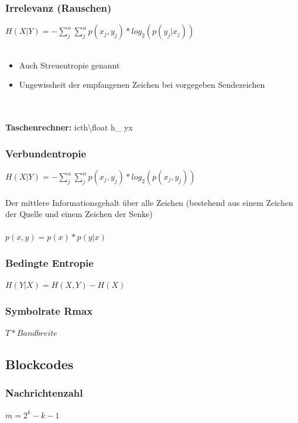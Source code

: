 \subsubsection{Irrelevanz (Rauschen)}
$H(X|Y)=-\sum_j^n\sum_j^np(x_j,y_j)*log_2(p(y_j|x_j))$
\\
\\
\begin{itemize}
	\item Auch Streuentropie genannt
	\item Ungewissheit der empfangenen Zeichen bei vorgegeben Sendezeichen
\end{itemize}
\\
\\
\textbf{Taschenrechner:} icth\textbackslash float h\_ yx

\subsubsection{Verbundentropie}
$H(X|Y)=-\sum_j^n\sum_j^np(x_j,y_j)*log_2(p(x_j,y_j))$
\\
\\
Der mittlere Informationsgehalt über alle Zeichen (bestehend aus einem Zeichen der Quelle und einem Zeichen der Senke) \\
\\
$p(x, y) = p(x) * p(y | x)$

\subsubsection{Bedingte Entropie}
$H(Y|X)=H(X,Y)-H(X)$

\subsubsection{Symbolrate Rmax}
$T*Bandbreite$
\clearpage

\subsection{Blockcodes}
\subsubsection{Nachrichtenzahl}
$m=2^k-k-1$

